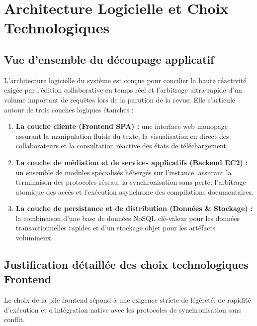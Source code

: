 \chapter{Architecture Logicielle et Choix Technologiques}

\section{Vue d'ensemble du découpage applicatif}

L'architecture logicielle du système est conçue pour concilier la haute réactivité exigée par l'édition collaborative en temps réel et l'arbitrage ultra-rapide d'un volume important de requêtes lors de la parution de la revue. Elle s'articule autour de trois couches logiques étanches :

\begin{enumerate}
    \item \textbf{La couche cliente (Frontend SPA) :} une interface web monopage assurant la manipulation fluide du texte, la visualisation en direct des collaborateurs et la consultation réactive des états de téléchargement.
    \item \textbf{La couche de médiation et de services applicatifs (Backend EC2) :} un ensemble de modules spécialisés hébergés sur l'instance, assurant la terminaison des protocoles réseau, la synchronisation sans perte, l'arbitrage atomique des accès et l'exécution asynchrone des compilations documentaires.
    \item \textbf{La couche de persistance et de distribution (Données \& Stockage) :} la combinaison d'une base de données NoSQL clé-valeur pour les données transactionnelles rapides et d'un stockage objet pour les artéfacts volumineux.
\end{enumerate}

\section{Justification détaillée des choix technologiques Frontend}

Le choix de la pile frontend répond à une exigence stricte de légèreté, de rapidité d'exécution et d'intégration native avec les protocoles de synchronisation sans conflit.

